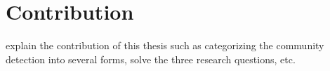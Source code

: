 \section{Contribution}
explain the contribution of this thesis such as categorizing the community detection into several forms, solve the three research questions, etc.